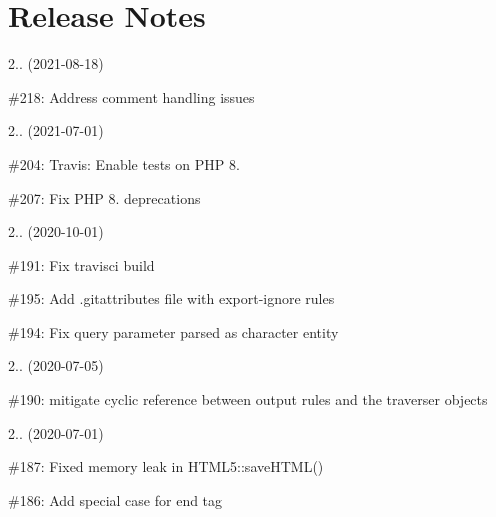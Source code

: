 \chapter{Release Notes }
\hypertarget{md__c_1_2xampp_2htdocs_2_g_pagos_ayuntamiento_2vendor_2masterminds_2html5_2_r_e_l_e_a_s_e}{}\label{md__c_1_2xampp_2htdocs_2_g_pagos_ayuntamiento_2vendor_2masterminds_2html5_2_r_e_l_e_a_s_e}
\label{md__c_1_2xampp_2htdocs_2_g_pagos_ayuntamiento_2vendor_2masterminds_2html5_2_r_e_l_e_a_s_e_autotoc_md9814}%
%


2.. (2021-\/08-\/18)


\begin{DoxyItemize}
\item \#218\+: Address comment handling issues
\end{DoxyItemize}

2.. (2021-\/07-\/01)


\begin{DoxyItemize}
\item \#204\+: Travis\+: Enable tests on PHP 8.
\item \#207\+: Fix PHP 8. deprecations
\end{DoxyItemize}

2.. (2020-\/10-\/01)


\begin{DoxyItemize}
\item \#191\+: Fix travisci build
\item \#195\+: Add .gitattributes file with export-\/ignore rules
\item \#194\+: Fix query parameter parsed as character entity
\end{DoxyItemize}

2.. (2020-\/07-\/05)


\begin{DoxyItemize}
\item \#190\+: mitigate cyclic reference between output rules and the traverser objects
\end{DoxyItemize}

2.. (2020-\/07-\/01)


\begin{DoxyItemize}
\item \#187\+: Fixed memory leak in HTML5\+::save\+HTML()
\item \#186\+: Add special case for end tag 
\end{DoxyItemize}

